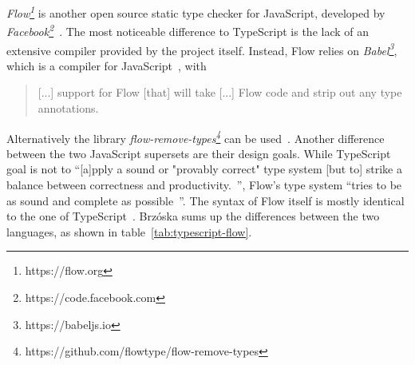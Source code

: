 \emph{Flow\footnote{https://flow.org}} is another open source static type checker for JavaScript, developed by \emph{Facebook\footnote{https://code.facebook.com}}~\cite{FacebookCode:Flow}. The most noticeable difference to TypeScript is the lack of an extensive compiler provided by the project itself. Instead, Flow relies on \emph{Babel\footnote{https://babeljs.io}}, which is a compiler for JavaScript~\cite{BabelWebsite}, with
\begin{quote}
  [...] support for Flow [that] will take [...] Flow code and strip out any type annotations.~\cite{FlowDocs:Install}
\end{quote}
Alternatively the library \emph{flow-remove-types\footnote{https://github.com/flowtype/flow-remove-types}} can be used~\cite{FlowDocs:Install}. Another difference between the two JavaScript supersets are their design goals. While TypeScript goal is not to ``[a]pply a sound or "provably correct" type system [but to] strike a balance between correctness and productivity.~\cite{TypeScriptWiki:DesignGoals}'', Flow's type system ``tries to be as sound and complete as possible~\cite{FlowDocs:TypesAndExpressions}''. The syntax of Flow itself is mostly identical to the one of TypeScript~\cite{FlowDocs:TypesAnnotations}. Brzóska sums up the differences between the two languages, as shown in table~\ref{tab:typescript-flow}.
